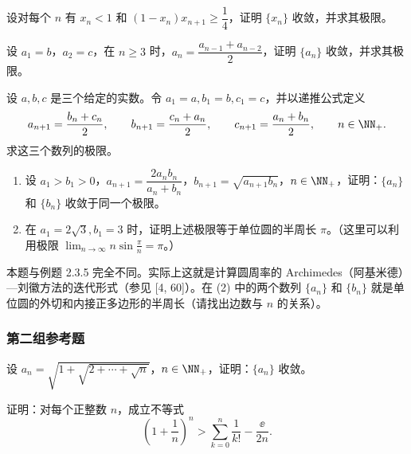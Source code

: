 \begin{xreferenceproblem}[17]
设对每个 $n$ 有 $x_n<1$ 和 $(1-x_n)x_{n+1}\ge\dfrac14$，证明 $\{x_n\}$ 收敛，并求其极限。
\end{xreferenceproblem}

\begin{xreferenceproblem}[18]
设 $a_1=b$，$a_2=c$，在 $n\ge3$ 时，$a_n=\dfrac{a_{n-1}+a_{n-2}}2$，证明 $\{a_n\}$ 收敛，并求其极限。
\end{xreferenceproblem}

\begin{xreferenceproblem}[19]
设 $a,b,c$ 是三个给定的实数。令 $a_1=a,b_1=b,c_1=c$，并以递推公式定义
  \[
    a_{n+1}=\frac{b_n+c_n}{2},\qquad
    b_{n+1}=\frac{c_n+a_n}{2},\qquad
    c_{n+1}=\frac{a_n+b_n}{2},\qquad n\in\NN_+.
  \]
  求这三个数列的极限。
\end{xreferenceproblem}

\begin{xreferenceproblem}[20]
\begin{enumerate}[label=(\arabic*)]
    \item 设 $a_1>b_1>0$，$a_{n+1}=\dfrac{2a_nb_n}{a_n+b_n}$，$b_{n+1}=\sqrt{a_{n+1}b_n}$，$n\in\NN_+$，证明：$\{a_n\}$ 和 $\{b_n\}$ 收敛于同一个极限。
    \item 在 $a_1=2\sqrt3,b_1=3$ 时，证明上述极限等于单位圆的半周长 $\pi$。（这里可以利用极限 $\displaystyle\lim_{n\to\infty}n\sin\frac\pi n=\pi$。）
  \end{enumerate}
\end{xreferenceproblem}

\begin{xremark}
本题与例题 2.3.5 完全不同。实际上这就是计算圆周率的 Archimedes（阿基米德）—刘徽方法的迭代形式（参见 [4, 60]）。在 (2) 中的两个数列 $\{a_n\}$ 和 $\{b_n\}$ 就是单位圆的外切和内接正多边形的半周长（请找出边数与 $n$ 的关系）。
\end{xremark}

\subsubsection*{第二组参考题}

\begin{xreferenceproblem}[1]
设 $a_n=\sqrt{1+\sqrt{2+\cdots+\sqrt n}}$，$n\in\NN_+$，证明：$\{a_n\}$ 收敛。
\end{xreferenceproblem}

\begin{xreferenceproblem}[2]
证明：对每个正整数 $n$，成立不等式
  \[
    \left(1+\frac1n\right)^n>\sum_{k=0}^n\frac1{k!}-\frac\ee{2n}.
  \]
\end{xreferenceproblem}

